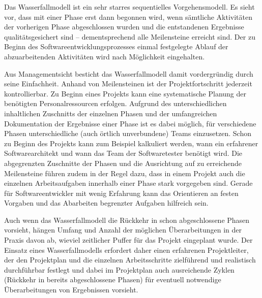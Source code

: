 
\vspace{1.5mm} %

Das Wasserfallmodell ist ein sehr starres sequentielles Vorgehensmodell. Es sieht vor, dass mit einer Phase erst dann begonnen wird, wenn sämtliche Aktivitäten der vorherigen Phase abgeschlossen wurden und die entstandenen Ergebnisse qualitätsgesichert sind – dementsprechend alle Meilensteine erreicht sind. Der zu Beginn des Softwareentwicklungsprozesses einmal festgelegte Ablauf der abzuarbeitenden Aktivitäten wird nach Möglichkeit eingehalten.

\vspace{0.6mm} %

Aus Managementsicht besticht das Wasserfallmodell damit vordergründig durch seine Einfachheit. Anhand von Meilensteinen ist der Projektfortschritt jederzeit kontrollierbar. Zu Beginn eines Projekts kann eine systematische Planung der benötigten Personalressourcen erfolgen. Aufgrund des unterschiedlichen inhaltlichen Zuschnitts der einzelnen Phasen und der umfangreichen Dokumentation der Ergebnisse einer Phase ist es dabei möglich, für verschiedene Phasen unterschiedliche (auch örtlich unverbundene) Teams einzusetzen. Schon zu Beginn des Projekts kann zum Beispiel kalkuliert werden, wann ein erfahrener Softwarearchitekt und wann das Team der Softwaretester benötigt wird. Die abgegrenzten Zuschnitte der Phasen und die Ausrichtung auf zu erreichende Meilensteine führen zudem in der Regel dazu, dass in einem Projekt auch die einzelnen Arbeitsaufgaben innerhalb einer Phase stark vorgegeben sind. Gerade für Softwareentwickler mit wenig Erfahrung kann das Orientieren an festen Vorgaben und das Abarbeiten begrenzter Aufgaben hilfreich sein.

\vspace{0.6mm} %

Auch wenn das Wasserfallmodell die Rückkehr in schon abgeschlossene Phasen vorsieht, hängen Umfang und Anzahl der möglichen Überarbeitungen in der Praxis davon ab, wieviel zeitlicher Puffer für das Projekt eingeplant wurde. Der Einsatz eines Wasserfallmodells erfordert daher einen erfahrenen Projektleiter, der den Projektplan und die einzelnen Arbeitsschritte zielführend und realistisch durchführbar festlegt und dabei im Projektplan auch ausreichende Zyklen (Rückkehr in bereits abgeschlossene Phasen) für eventuell notwendige Überarbeitungen von Ergebnissen vorsieht. 

